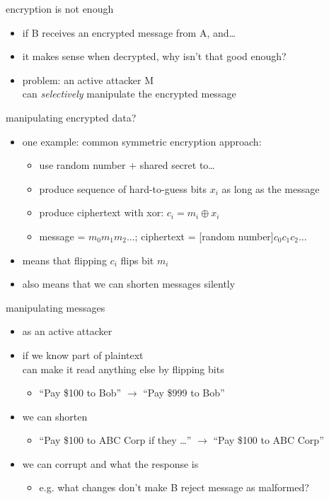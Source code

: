 \begin{frame}{encryption is not enough}
    \begin{itemize}
    \item if B receives an encrypted message from A, and\ldots
    \item it makes sense when decrypted, why isn't that good enough?
    \vspace{.5cm}
    \item problem: an active attacker M \\
        can \textit{selectively} manipulate the encrypted message
    \end{itemize}
\end{frame}

\begin{frame}{manipulating encrypted data?}
\begin{itemize}
\item one example: common symmetric encryption approach:
    \begin{itemize}
    \item use random number + shared secret to\ldots
    \item produce sequence of hard-to-guess bits $x_i$ as long as the message
    \item produce ciphertext with xor: $c_i = m_i \oplus x_i$
    \item message = $m_0m_1m_2\ldots$; ciphertext = [random number]$c_0c_1c_2\ldots$
    \end{itemize}
\item means that flipping $c_i$ flips bit $m_i$ 
\item also means that we can shorten messages silently
\end{itemize}
\end{frame}

\begin{frame}{manipulating messages}
\begin{itemize}
\item as an active attacker
\vspace{.5cm}
\item if we know part of plaintext \\
    can make it read anything else by flipping bits
    \begin{itemize}
    \item ``Pay \$100 to Bob'' $\rightarrow$ ``Pay \$999 to Bob''
    \end{itemize}
\item we can shorten 
    \begin{itemize}
    \item ``Pay \$100 to ABC Corp if they \ldots'' $\rightarrow$ ``Pay \$100 to ABC Corp''
    \end{itemize}
\item we can corrupt and what the response is
    \begin{itemize}
    \item e.g. what changes don't make B reject message as malformed?
    \end{itemize}
\end{itemize}
\end{frame}

